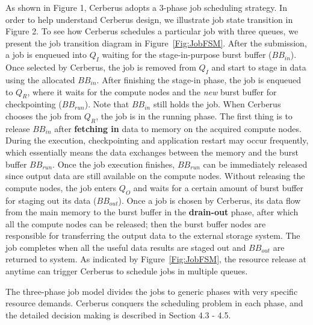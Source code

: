 As shown in Figure 1, Cerberus adopts a 3-phase job scheduling strategy. 
In order to help understand Cerberus design, we illustrate job state transition in Figure 2.
To see how Cerberus schedules a particular job with three queues,
we present the job transition diagram in Figure~\ref{Fig:JobFSM}.
After the submission, a job is enqueued into $Q_I$ waiting for the stage-in-purpose burst buffer ($BB_{in}$).
Once selected by Cerberus, the job is removed from $Q_I$ and start to stage in data using the allocated $BB_{in}$.
After finishing the stage-in phase, the job is enqueued to $Q_R$,
where it waits for the compute nodes and the \textit{new} burst buffer for checkpointing ($BB_{run}$).
Note that $BB_{in}$ still holds the job. When Cerberus chooses the job from $Q_R$, the job is in the running phase.
The first thing is to release $BB_{in}$ after \textbf{fetching in} data to memory on the acquired compute nodes.
During the execution, checkpointing and application restart may occur frequently,
which essentially means the data exchanges between the memory and the burst buffer $BB_{run}$.
Once the job execution finishes, $BB_{run}$ can be immediately released since
output data are still available on the compute nodes.
Without releasing the compute nodes, the job enters $Q_O$ and waits for a certain amount of burst buffer for staging out its data ($BB_{out}$).
Once a job is chosen by Cerberus, its data flow from the main memory to the burst buffer
in the \textbf{drain-out} phase, after which all the compute nodes can be released;
then the burst buffer nodes are responsible for transferring the output data to the external storage system.
The job completes when all the useful data results are staged out and $BB_{out}$ are returned to system.
As indicated by Figure~\ref{Fig:JobFSM}, the resource release at anytime can trigger Cerberus
to schedule jobs in multiple queues.

The three-phase job model divides the jobs to generic phases with very specific resource demands.
Cerberus conquers the scheduling problem in each phase, and the detailed decision making is described in Section 4.3 - 4.5.

